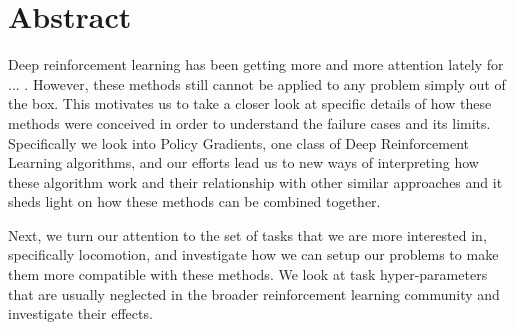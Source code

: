 
\chapter{Abstract}

Deep reinforcement learning has been getting more and more attention lately for ... . However, these methods still cannot be applied to any problem simply out of the box. This motivates us to take a closer look at specific details of how these methods were conceived in order to understand the failure cases  and its limits. Specifically we look into Policy Gradients, one class of Deep Reinforcement Learning algorithms, and our efforts lead us to new ways of interpreting how these algorithm work and their relationship with other similar approaches and it sheds light on how these methods can be combined together.

Next, we turn our attention to the set of tasks that we are more interested in, specifically locomotion, and investigate how we can setup our problems to make them more compatible with these methods. We look at task hyper-parameters that are usually neglected in the broader reinforcement learning community and investigate their effects.









